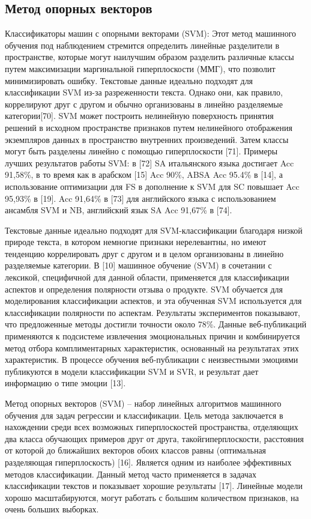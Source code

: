 \subsection{Метод опорных векторов}

Классификаторы машин с опорными векторами (SVM): Этот метод машинного обучения
под наблюдением стремится определить линейные разделители в пространстве,
которые могут наилучшим образом разделить различные классы путем максимизации
маргинальной гиперплоскости (ММГ), что позволит минимизировать ошибку. Текстовые
данные идеально подходят для классификации SVM из-за разреженности текста.
Однако они, как правило, коррелируют друг с другом и обычно организованы в
линейно разделяемые категории[70]. SVM может построить нелинейную поверхность
принятия решений в исходном пространстве признаков путем нелинейного отображения
экземпляров данных в пространство внутренних произведений. Затем классы могут
быть разделены линейно с помощью гиперплоскости [71].  Примеры лучших
результатов работы SVM: в [72] SA итальянского языка достигает Acc 91,58\%, в то
время как в арабском [15] Acc 90\%, ABSA Acc 95.4\% в [14], а использование
оптимизации для FS в дополнение к SVM для SC повышает Acc 95,93\% в [19]. Acc
91,64\% в [73] для английского языка с использованием ансамбля SVM и NB,
английский язык SA Acc 91,67\% в [74].~\cite{article2}

Текстовые данные идеально подходят для SVM-классификации благодаря низкой
природе текста, в котором немногие признаки нерелевантны, но имеют тенденцию
коррелировать друг с другом и в целом организованы в линейно разделяемые
категории.
В [10] машинное обучение (SVM) в сочетании с лексикой, специфичной для данной
области, применяется для классификации аспектов и определения полярности отзыва
о продукте. SVM обучается для моделирования классификации аспектов, и эта
обученная SVM используется для классификации полярности по аспектам. Результаты
экспериментов показывают, что предложенные методы достигли точности около 78\%.
Данные веб-публикаций применяются к подсистеме извлечения эмоциональных причин и
комбинируется метод отбора комплиментарных характеристик, основанный на
результатах этих характеристик. В процессе обучения веб-публикации с
неизвестными эмоциями публикуются в модели классификации SVM и SVR, и результат
дает информацию о типе эмоции [13].~\cite{article4}

Метод опорных векторов (SVM) – набор линейных алгоритмов машинного обучения для
задач регрессии и классификации. Цель метода заключается в нахождении среди всех
возможных гиперплоскостей пространства, отделяющих два класса обучающих примеров
друг от друга, такойгиперплоскости, расстояния от которой до ближайших векторов
обоих классов равны (оптимальная разделяющая гиперплоскость) [16]. Является
одним из наиболее эффективных методов классификации. Данный метод часто
применяется в задачах классификации текстов и показывает хорошие результаты
[17]. Линейные модели хорошо масштабируются, могут работать с большим
количеством признаков, на очень больших выборках.~\cite{article9}

